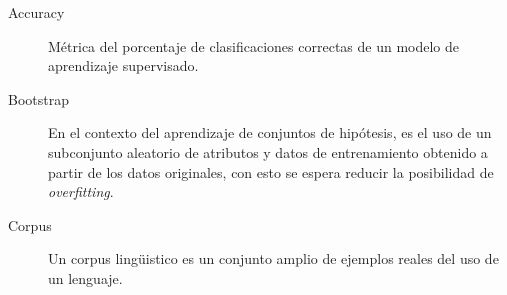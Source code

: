 \documentclass[12pt]{article}
\begin{document}
\begin{description}
\item[Accuracy] Métrica del porcentaje de clasificaciones correctas de un modelo de
aprendizaje supervisado.
\item[Bootstrap] En el contexto del aprendizaje de conjuntos de hipótesis,
es el uso de un subconjunto aleatorio de atributos y datos de entrenamiento obtenido
a partir de los datos originales, con esto se espera reducir la posibilidad de
\emph{overfitting}.
\item[Corpus] Un corpus lingüistico es un conjunto amplio de ejemplos reales del uso de un
lenguaje.

\end{description}
\end{document}
